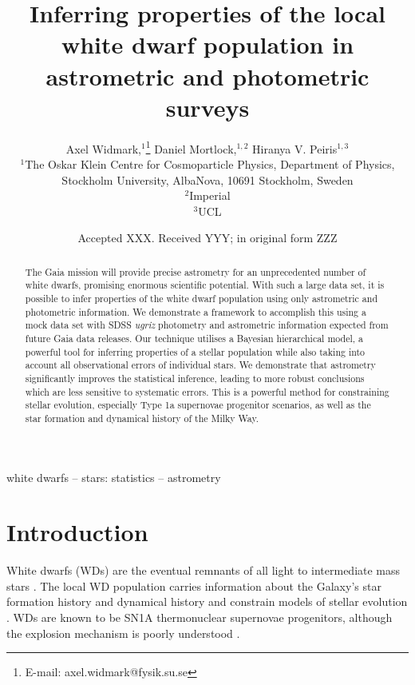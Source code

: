 \documentclass[fleqn,usenatbib]{mnras}
\title[Inferring properties of the white dwarf population]{Inferring properties of the local white dwarf population in astrometric and photometric surveys}
\author[A. Widmark et al.]{
Axel Widmark,$^1$\thanks{E-mail: axel.widmark@fysik.su.se} 
Daniel Mortlock,$^{1,2}$
Hiranya V. Peiris$^{1,3}$
\\
$^1$The Oskar Klein Centre for Cosmoparticle Physics, Department of
Physics, Stockholm University, AlbaNova, 10691 Stockholm, Sweden\\
$^2$Imperial\\
$^3$UCL\\
}
\date{Accepted XXX. Received YYY; in original form ZZZ}
\begin{document}
\label{firstpage}
\pagerange{\pageref{firstpage}--\pageref{lastpage}}
\maketitle

\begin{abstract}
The Gaia mission will provide precise astrometry for an unprecedented number of white dwarfs, promising enormous scientific potential. With such a large data set, it is possible to infer properties of the white dwarf population using only astrometric and photometric information. We demonstrate a framework to accomplish this using a mock data set with SDSS \emph{ugriz} photometry and astrometric information expected from future Gaia data releases.
Our technique utilises a Bayesian hierarchical model, a powerful tool for inferring properties of a stellar population while also taking into account all observational errors of individual stars. We demonstrate that astrometry significantly improves the statistical inference, leading to more robust conclusions which are less sensitive to systematic errors.
This is a powerful method for constraining stellar evolution, especially Type 1a supernovae progenitor scenarios, as well as the star formation and dynamical history of the Milky Way.
\end{abstract}

\begin{keywords}
white dwarfs -- stars: statistics -- astrometry
\end{keywords}









\section{Introduction}

White dwarfs (WDs) are the eventual remnants of all light to intermediate mass stars \citep{1996ApJ...460..489R}. The local WD population carries information about the Galaxy's star formation history and dynamical history and constrain models of stellar evolution \citep{2016NewAR..72....1G,2018arXiv180505849E}. WDs are known to be SN1A thermonuclear supernovae progenitors, although the explosion mechanism is poorly understood \citep{Livio:2018rue}.
\end{document}
